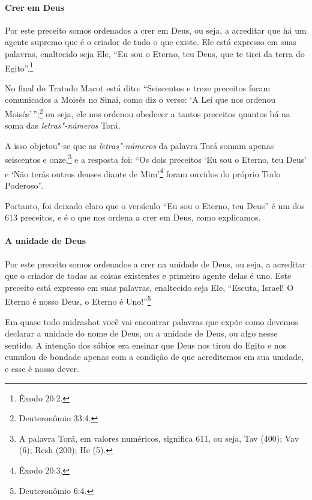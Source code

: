 \begin{multicols}{2}
\paragraph{Crer em Deus}

Por este preceito somos ordenados a crer em Deus, ou seja, a acreditar
que há um agente supremo que é o criador de tudo o que existe. Ele está
expresso em suas palavras, enaltecido seja Ele, ``Eu sou o Eterno, teu
Deus, que te tirei da terra do Egito''.\footnote{Êxodo 20:2.}

No final do Tratado Macot\starr{} está dito: ``Seiscentos e treze preceitos
foram comunicados a Moisés no Sinai, como diz o verso: `A Lei que nos
ordenou Moisés'\,'';\footnote{Deuteronômio 33:4.} ou seja, ele nos ordenou obedecer a tantos preceitos quantos há na soma das \emph{letras"-números} Torá\starr. 

A isso objetou"-se que as \emph{letras"-números} da palavra Torá\starr{} somam apenas seiscentos e onze,\footnote{A palavra Torá\starr, em valores numéricos, significa 611, ou seja, Tav (400); Vav (6); Resh (200); He (5).} e a resposta foi: ``Os dois preceitos `Eu sou o Eterno, teu Deus' e `Não terás outros
deuses diante de Mim'\footnote{Êxodo 20:3.} foram ouvidos do próprio Todo
Poderoso''.

Portanto, foi deixado claro que o versículo ``Eu sou o Eterno, teu
Deus'' é um dos 613 preceitos, e é o que nos ordena a crer em Deus, como
explicamos.

\paragraph{A unidade de Deus}

Por este preceito somos ordenados a crer na unidade de Deus, ou seja, a
acreditar que o criador de todas as coisas existentes e primeiro agente
delas é uno. Este preceito está expresso em suas palavras, enaltecido
seja Ele, ``Escuta, Israel! O Eterno é nosso Deus, o Eterno é Uno!''\footnote{Deuteronômio 6:4.}

Em quase todo midrashot\starr{} você vai encontrar palavras que
expõe como devemos declarar a unidade do nome de Deus, ou a unidade
de Deus, ou algo nesse sentido. A intenção dos sábios era ensinar que
Deus nos tirou do Egito e nos cumulou de bondade apenas com a condição
de que acreditemos em sua unidade, e esse é nosso dever.


\end{multicols}
